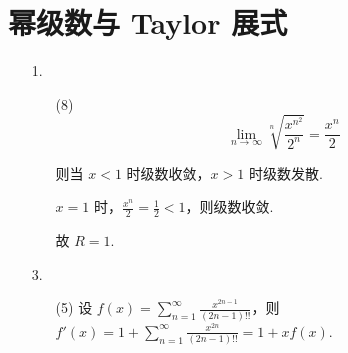 \documentclass[oneside]{ctexbook} %
\begin{document}
\section{幂级数与 Taylor 展式}

\begin{enumerate}
    \item[1.]
    \begin{enumerate}
        \item[(8)]
        $$
        \lim_{n \to \infty} \sqrt[n]{\frac{x^{n^2}}{2^n}} = \frac {x^n} 2
        $$

        则当 $x < 1$ 时级数收敛，$x > 1$ 时级数发散.

        $x = 1$ 时，$\frac {x^n} 2 = \frac 1 2 < 1$，则级数收敛.

        故 $R = 1$.
    \end{enumerate}
    \item[3.]
    \begin{enumerate}
        \item[(5)]
        设 $\displaystyle f(x) = \sum_{n=1}^{\infty} \frac{x^{2n-1}}{(2n-1)!!}$，则 $\displaystyle f'(x) = 1 + \sum_{n=1}^{\infty} \frac{x^{2n}}{(2n-1)!!} = 1 + xf(x)$.


\end{enumerate}
\end{enumerate}
\end{document}
